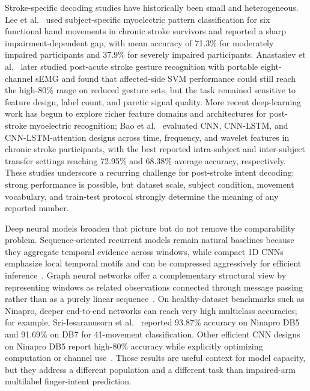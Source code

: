 Stroke-specific decoding studies have historically been small and heterogeneous. Lee et al.~\citep{lee2010stroke} used subject-specific myoelectric pattern classification for six functional hand movements in chronic stroke survivors and reported a sharp impairment-dependent gap, with mean accuracy of 71.3\% for moderately impaired participants and 37.9\% for severely impaired participants. Anastasiev et al.~\citep{anastasiev2022stroke} later studied post-acute stroke gesture recognition with portable eight-channel sEMG and found that affected-side SVM performance could still reach the high-80\% range on reduced gesture sets, but the task remained sensitive to feature design, label count, and paretic signal quality. More recent deep-learning work has begun to explore richer feature domains and architectures for post-stroke myoelectric recognition; Bao et al.~\citep{bao2024poststroke} evaluated CNN, CNN-LSTM, and CNN-LSTM-attention designs across time, frequency, and wavelet features in chronic stroke participants, with the best reported intra-subject and inter-subject transfer settings reaching 72.95\% and 68.38\% average accuracy, respectively. These studies underscore a recurring challenge for post-stroke intent decoding: strong performance is possible, but dataset scale, subject condition, movement vocabulary, and train-test protocol strongly determine the meaning of any reported number.

Deep neural models broaden that picture but do not remove the comparability problem. Sequence-oriented recurrent models remain natural baselines because they aggregate temporal evidence across windows, while compact 1D CNNs emphasize local temporal motifs and can be compressed aggressively for efficient inference~\citep{hochreiter1997lstm}. Graph neural networks offer a complementary structural view by representing windows as related observations connected through message passing rather than as a purely linear sequence~\citep{kipf2017gcn,hamilton2017graphsage,velickovic2018gat}. On healthy-dataset benchmarks such as Ninapro, deeper end-to-end networks can reach very high multiclass accuracies; for example, Sri-Iesaranusorn et al.~\citep{sri2021dnn} reported 93.87\% accuracy on Ninapro DB5 and 91.69\% on DB7 for 41-movement classification. Other efficient CNN designs on Ninapro DB5 report high-80\% accuracy while explicitly optimizing computation or channel use~\citep{ni2024survey}. Those results are useful context for model capacity, but they address a different population and a different task than impaired-arm multilabel finger-intent prediction.

